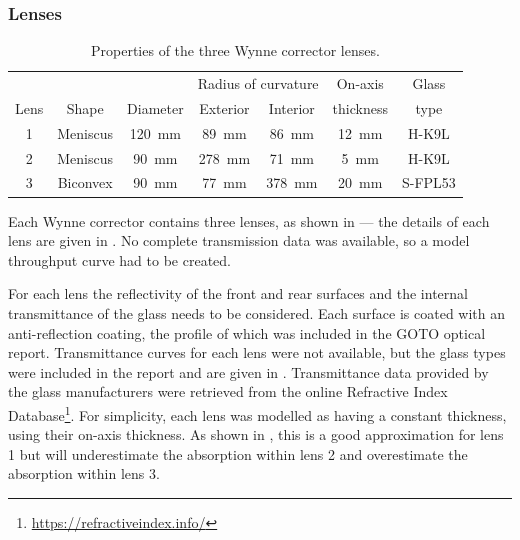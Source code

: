 \begin{colsection}
\begin{colsection}
\clearpage

\subsubsection{Lenses}

\begin{table}[t]
    \begin{center}
        \begin{tabular}{c|ccccc|c} %
                 &       &                        & \multicolumn{2}{c}{Radius of curvature}         & On-axis               & Glass \\
            Lens & Shape & Diameter               & Exterior               & Interior               & thickness             & type \\
            \midrule
            1 & Meniscus & \SI{120}{\milli\metre} &  \SI{89}{\milli\metre} &  \SI{86}{\milli\metre} & \SI{12}{\milli\metre} & H-K9L   \\
            2 & Meniscus &  \SI{90}{\milli\metre} & \SI{278}{\milli\metre} &  \SI{71}{\milli\metre} &  \SI{5}{\milli\metre} & H-K9L   \\
            3 & Biconvex &  \SI{90}{\milli\metre} &  \SI{77}{\milli\metre} & \SI{378}{\milli\metre} & \SI{20}{\milli\metre} & S-FPL53 \\
        \end{tabular}
    \end{center}
    \caption[Wynne corrector lens properties]{
        Properties of the three Wynne corrector lenses.
    }\label{tab:lenses}
\end{table}

Each Wynne corrector contains three lenses, as shown in  --- the details of each lens are given in . No complete transmission data was available, so a model throughput curve had to be created.

For each lens the reflectivity of the front and rear surfaces and the internal transmittance of the glass needs to be considered. Each surface is coated with an anti-reflection coating, the profile of which was included in the GOTO optical report. Transmittance curves for each lens were not available, but the glass types were included in the report and are given in . Transmittance data provided by the glass manufacturers were retrieved from the online Refractive Index Database\footnote{\url{https://refractiveindex.info/}}. For simplicity, each lens was modelled as having a constant thickness, using their on-axis thickness. As shown in , this is a good approximation for lens 1 but will underestimate the absorption within lens 2 and overestimate the absorption within lens 3.


\end{colsection}
\end{colsection}

